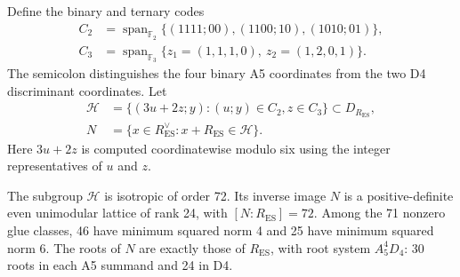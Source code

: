 Define the binary and ternary codes
\begin{equation}
 \begin{split}
 C_2&=\operatorname{span}_{\mathbb F_2}
       \{(1111;00),(1100;10),(1010;01)\},\\
 C_3&=\operatorname{span}_{\mathbb F_3}
       \{z_1=(1,1,1,0),\ z_2=(1,2,0,1)\}.
 \end{split}
 \label{esn:eq:codes}
\end{equation}
The semicolon distinguishes the four binary A5 coordinates from the
two D4 discriminant coordinates.  Let
\begin{equation}
 \begin{split}
 \mathcal H&=\{(3u+2z;y):(u;y)\in C_2, z\in C_3\}
                                  \subset D_{R_{\mathrm{ES}}},\\
 N&=\{x\in R_{\mathrm{ES}}^\vee:
                                x+R_{\mathrm{ES}}\in\mathcal H\}.
 \end{split}
 \label{esn:eq:glue-and-overlattice}
\end{equation}
Here \(3u+2z\) is computed coordinatewise modulo six using the
integer representatives of \(u\) and \(z\).

\begin{theorem}
\label{esn:thm:niemeier}
The subgroup \(\mathcal H\) is isotropic of order 72.  Its inverse
image \(N\) is a positive-definite even unimodular lattice of rank 24,
with \([N:R_{\mathrm{ES}}]=72\).  Among the 71 nonzero glue classes,
46 have minimum squared norm 4 and 25 have minimum squared norm 6.
The roots of \(N\) are exactly those of \(R_{\mathrm{ES}}\), with
root system \(A_5^4D_4\): 30 roots in each A5 summand and 24 in D4.
\end{theorem}

